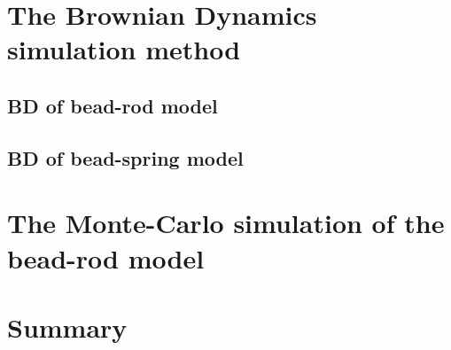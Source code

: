 
\section{The Brownian Dynamics simulation method}
\label{sec:the_brownian_dynamics_simulation_method}

\subsection{BD of bead-rod model}
\label{sub:bd_of_bead_rod_model}

\subsection{BD of bead-spring model}
\label{sub:bd_of_bead_spring_model}



\section{The Monte-Carlo simulation of the bead-rod model}
\label{sec:the_monte_carlo_simulation_of_the_bead_rod_model}



\section{Summary}
\label{sec:summary}



